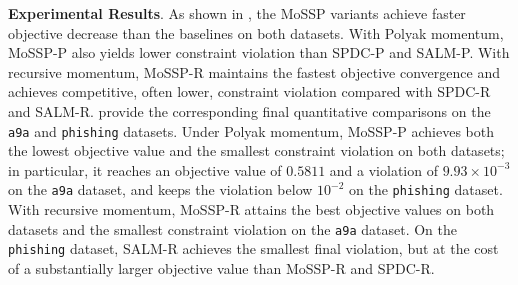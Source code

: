 \documentclass{article}
\theoremstyle{plain}
\theoremstyle{definition}
\theoremstyle{remark}
\numberwithin{equation}{section}
\begin{document}
\noindent\textbf{Experimental Results}. As shown in , the MoSSP variants achieve faster objective decrease than the baselines on both datasets. With Polyak momentum, MoSSP-P also yields lower constraint violation than SPDC-P and SALM-P. With recursive momentum, MoSSP-R maintains the fastest objective convergence and achieves competitive, often lower, constraint violation compared with SPDC-R and SALM-R.  provide the corresponding final quantitative comparisons on the \texttt{a9a} and \texttt{phishing} datasets. Under Polyak momentum, MoSSP-P achieves both the lowest objective value and the smallest constraint violation on both datasets; in particular, it reaches an objective value of \(0.5811\) and a violation of \(9.93\times 10^{-3}\) on the \texttt{a9a} dataset, and keeps the violation below \(10^{-2}\) on the \texttt{phishing} dataset. With recursive momentum, MoSSP-R attains the best objective values on both datasets and the smallest constraint violation on the \texttt{a9a} dataset. On the \texttt{phishing} dataset, SALM-R achieves the smallest final violation, but at the cost of a substantially larger objective value than MoSSP-R and SPDC-R.
\end{document}
